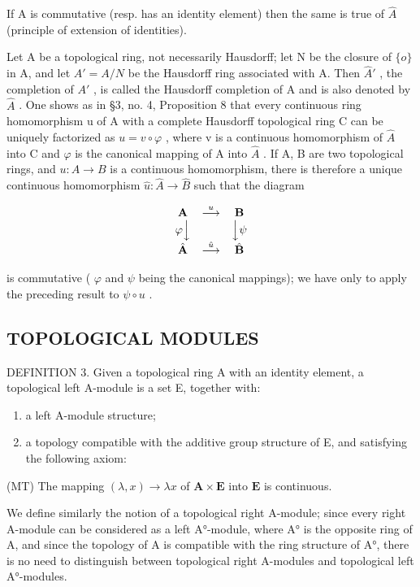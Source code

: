 If A is commutative (resp. has an identity element) then the same is true of \(\hat{A}\) (principle of extension of identities).

Let A be a topological ring, not necessarily Hausdorff; let N be the closure of \(\{o\}\) in A, and let \(A' = A/N\) be the Hausdorff ring associated with A. Then \(\hat{A}'\) , the completion of \(A'\) , is called the Hausdorff completion of A and is also denoted by \(\hat{A}\) . One shows as in §3, no. 4, Proposition 8 that every continuous ring homomorphism u of A with a complete Hausdorff topological ring C can be uniquely factorized as \(u = v \circ \varphi\) , where v is a continuous homomorphism of \(\hat{A}\) into C and \(\varphi\) is the canonical mapping of A into \(\hat{A}\) . If A, B are two topological rings, and \(u : A \to B\) is a continuous homomorphism, there is therefore a unique continuous homomorphism \(\hat{u} : \hat{A} \to \hat{B}\) such that the diagram

\[
\begin{array}{c c c} \mathbf {A} & \stackrel {{u}} {{\longrightarrow}} & \mathbf {B} \\ \varphi \Big \downarrow & & \Big \downarrow \psi \\ \hat {\mathbf {A}} & \stackrel {{\hat {u}}} {{\longrightarrow}} & \hat {\mathbf {B}} \end{array}
\]

is commutative ( \(\varphi\) and \(\psi\) being the canonical mappings); we have only to apply the preceding result to \(\psi \circ u\) .

\subsection{TOPOLOGICAL MODULES}

DEFINITION 3. Given a topological ring A with an identity element, a topological left A-module is a set E, together with:

\begin{enumerate}
\def\labelenumi{\arabic{enumi})}
\item
  a left A-module structure;
\item
  a topology compatible with the additive group structure of E, and satisfying the following axiom:
\end{enumerate}

(MT) The mapping \((\lambda, x) \to \lambda x\) of \(\mathbf{A} \times \mathbf{E}\) into \(\mathbf{E}\) is continuous.

We define similarly the notion of a topological right A-module; since every right A-module can be considered as a left A°-module, where A° is the opposite ring of A, and since the topology of A is compatible with the ring structure of A°, there is no need to distinguish between topological right A-modules and topological left A°-modules.

